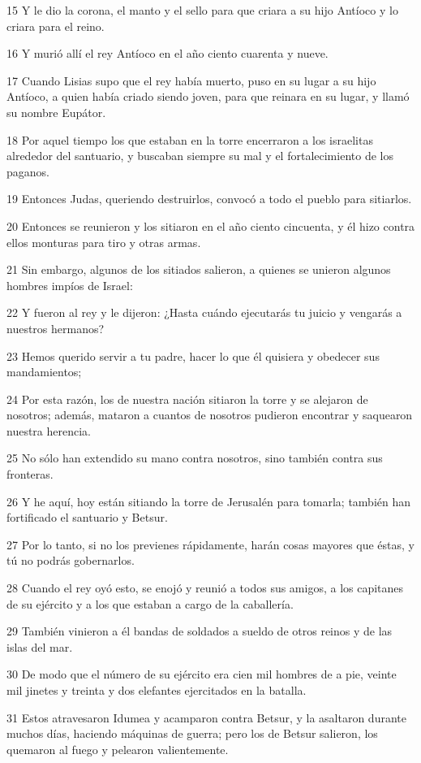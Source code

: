 \par 15 Y le dio la corona, el manto y el sello para que criara a su hijo Antíoco y lo criara para el reino.
\par 16 Y murió allí el rey Antíoco en el año ciento cuarenta y nueve.
\par 17 Cuando Lisias supo que el rey había muerto, puso en su lugar a su hijo Antíoco, a quien había criado siendo joven, para que reinara en su lugar, y llamó su nombre Eupátor.
\par 18 Por aquel tiempo los que estaban en la torre encerraron a los israelitas alrededor del santuario, y buscaban siempre su mal y el fortalecimiento de los paganos.
\par 19 Entonces Judas, queriendo destruirlos, convocó a todo el pueblo para sitiarlos.
\par 20 Entonces se reunieron y los sitiaron en el año ciento cincuenta, y él hizo contra ellos monturas para tiro y otras armas.
\par 21 Sin embargo, algunos de los sitiados salieron, a quienes se unieron algunos hombres impíos de Israel:
\par 22 Y fueron al rey y le dijeron: ¿Hasta cuándo ejecutarás tu juicio y vengarás a nuestros hermanos?
\par 23 Hemos querido servir a tu padre, hacer lo que él quisiera y obedecer sus mandamientos;
\par 24 Por esta razón, los de nuestra nación sitiaron la torre y se alejaron de nosotros; además, mataron a cuantos de nosotros pudieron encontrar y saquearon nuestra herencia.
\par 25 No sólo han extendido su mano contra nosotros, sino también contra sus fronteras.
\par 26 Y he aquí, hoy están sitiando la torre de Jerusalén para tomarla; también han fortificado el santuario y Betsur.
\par 27 Por lo tanto, si no los previenes rápidamente, harán cosas mayores que éstas, y tú no podrás gobernarlos.
\par 28 Cuando el rey oyó esto, se enojó y reunió a todos sus amigos, a los capitanes de su ejército y a los que estaban a cargo de la caballería.
\par 29 También vinieron a él bandas de soldados a sueldo de otros reinos y de las islas del mar.
\par 30 De modo que el número de su ejército era cien mil hombres de a pie, veinte mil jinetes y treinta y dos elefantes ejercitados en la batalla.
\par 31 Estos atravesaron Idumea y acamparon contra Betsur, y la asaltaron durante muchos días, haciendo máquinas de guerra; pero los de Betsur salieron, los quemaron al fuego y pelearon valientemente.
